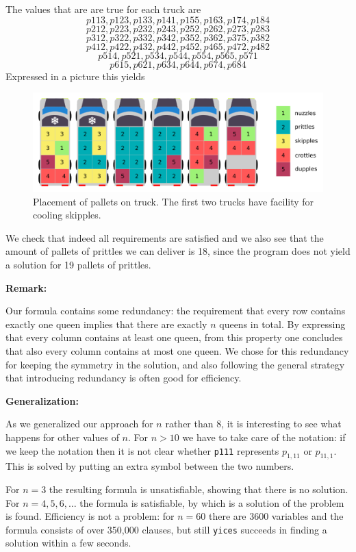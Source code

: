 \documentclass[a4paper]{article}
\begin{document}
The values that are are true for each truck are 
\[p113, p123, p133, p141, p155, p163, p174, p184 \]
\[p212, p223, p232, p243, p252, p262, p273, p283 \]
\[p312, p322, p332, p342, p352, p362, p375, p382 \]
\[p412, p422, p432, p442, p452, p465, p472, p482 \]
\[p514, p521, p534, p544, p554, p565, p571 \]
\[p615, p621, p634, p644, p674, p684 \]
Expressed in a picture this yields

\begin{figure}[H]
			\centering
				\includegraphics[scale=1]{trucks.png}
			\caption{Placement of pallets on truck. The first two trucks have facility for cooling skipples.}
		\end{figure}

We check that indeed all requirements are satisfied and we also see that the amount of pallets of prittles we can deliver is 18, since the program does not yield a solution for 19 pallets of prittles.

{\bf Remark:} 

Our formula contains some redundancy: the requirement that every
row contains exactly one queen implies that there are exactly $n$
queens in total. By expressing that every column contains at least
one queen, from this property one concludes that also every column
contains at most one queen. We chose for this redundancy for
keeping the symmetry in the solution, and also following the
general strategy that introducing redundancy is often good for
efficiency.

\vspace{3mm}

{\bf Generalization:} 

As we generalized our approach for $n$ rather than 8, it is
interesting to see what happens for other values of $n$. For $n
> 10$ we have to take care of the notation: if we keep the
notation then it is not clear whether {\tt p111} represents 
$p_{1,11}$ or $p_{11,1}$. This is solved by putting an extra 
symbol between the two numbers. 

For $n=3$ the resulting formula is unsatisfiable, showing that
there is no solution. For $n = 4,5,6,\ldots$ the formula is
satisfiable, by which is a solution of the problem is found.
Efficiency is not a problem: for $n = 60$ there are 3600
variables and the formula consists of over 350,000 clauses, but 
still {\tt yices} succeeds in finding a solution within a few
seconds.
\end{document}
